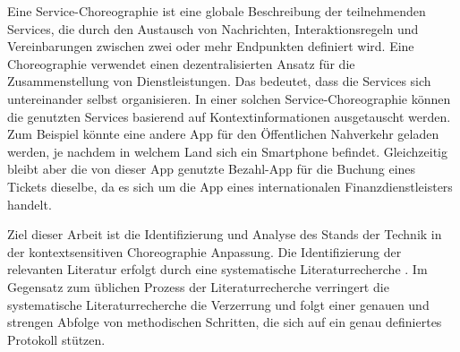 \documentclass[conference,compsoc]{IEEEtran}
\begin{document}
Eine Service-Choreographie ist eine globale Beschreibung der teilnehmenden Services, die durch den Austausch von Nachrichten, Interaktionsregeln und Vereinbarungen zwischen zwei oder mehr Endpunkten definiert wird. Eine Choreographie verwendet einen dezentralisierten Ansatz für die Zusammenstellung von Dienstleistungen. Das bedeutet, dass die Services sich untereinander selbst organisieren. In einer solchen Service-Choreographie können die genutzten Services basierend auf Kontextinformationen ausgetauscht werden. Zum Beispiel könnte eine andere App für den Öffentlichen Nahverkehr geladen werden, je nachdem in welchem Land sich ein Smartphone befindet. Gleichzeitig bleibt aber die von dieser App genutzte Bezahl-App für die Buchung eines Tickets dieselbe, da es sich um die App eines internationalen Finanzdienstleisters handelt.

Ziel dieser Arbeit ist die Identifizierung und Analyse des Stands der Technik in der kontextsensitiven Choreographie Anpassung. Die Identifizierung der relevanten Literatur erfolgt durch eine systematische Literaturrecherche \cite{budgen2006performing,kitchenham2009systematic}. Im Gegensatz zum üblichen Prozess der Literaturrecherche verringert die systematische Literaturrecherche die Verzerrung und folgt einer genauen und strengen Abfolge von methodischen Schritten, die sich auf ein genau definiertes Protokoll stützen.




%
%
\end{document}
